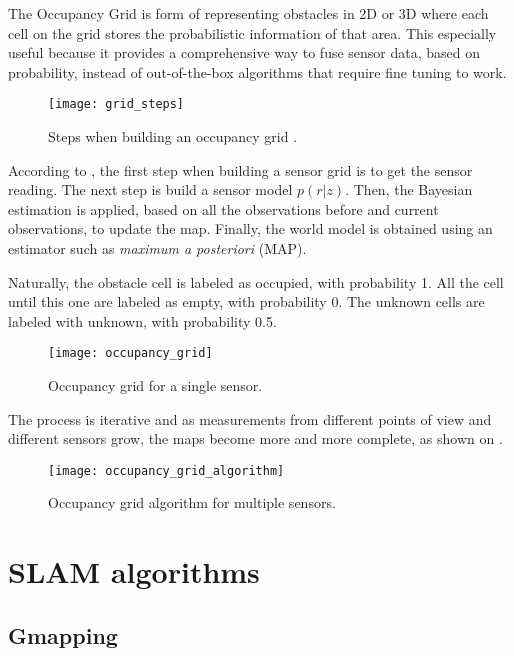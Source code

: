 The Occupancy Grid is form of representing obstacles in 2D or 3D where each cell on the grid stores the probabilistic information of that area. This especially useful because it provides a comprehensive way to fuse sensor data, based on probability, instead of out-of-the-box algorithms that require fine tuning to work.

\begin{figure}[!ht]
    \centering
    \texttt{[image: grid\_steps]}
    \caption{Steps when building an occupancy grid \cite{elfes1989using}.}
    \label{fig:grid_steps}
\end{figure}

According to , the first step when building a sensor grid is to get the sensor reading. The next step is build a sensor model $p(r|z)$. Then, the Bayesian estimation is applied, based on all the observations before and current observations, to update the map. Finally, the world model is obtained using an estimator such as \textit{maximum a posteriori} (MAP).

Naturally, the obstacle cell is labeled as occupied, with probability 1. All the cell until this one are labeled as empty, with probability 0. The unknown cells are labeled with unknown, with probability 0.5.

\begin{figure}[!ht]
    \centering
    \texttt{[image: occupancy\_grid]}
    \caption{Occupancy grid for a single sensor.}
    \label{fig:occupancy_grid}
\end{figure}

The process is iterative and as measurements from different points of view and different sensors grow, the maps become more and more complete, as shown on .

\begin{figure}[!ht]
    \centering
    \texttt{[image: occupancy\_grid\_algorithm]}
    \caption{Occupancy grid algorithm for multiple sensors.}
    \label{fig:occupancy_grid_algorithm}
\end{figure}

\section{SLAM algorithms}

\subsection{Gmapping}

